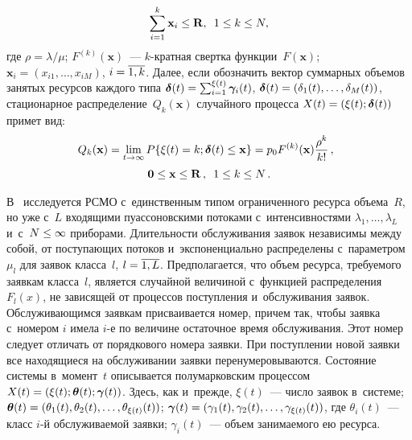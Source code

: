 \begin{multicols}{2}
\begin{align*}
\sum\limits_{i=1}^{k}\mathbf{x}_i\leq \mathbf{R}, \enskip 1\leq k \leq N,
\end{align*}
где $\rho=\lambda/\mu$; $F^{(k)}(\mathbf{x})$~--- $k$-крат\-ная свертка 
функции~$F(\mathbf{x})$; $\mathbf{x}_i=(x_{i1},\ldots,x_{iM})$, $i\hm=\overline{1,k}$.
Далее, если обозначить вектор суммарных объемов занятых ресурсов каждого типа 
$\boldsymbol{\delta}(t)\hm=\sum\nolimits_{i=1}^{\xi(t)}\boldsymbol{\gamma}_i(t)$, 
$\boldsymbol{\delta}(t)\hm=(\delta_1(t),\ldots,\delta_M(t))$, стационарное 
распределение~$Q_k(\mathbf{x})$ случайного процесса 
$X(t)\hm=(\xi(t);\boldsymbol{\delta}(t))$ примет вид:
\begin{multline*}
\label{eq:Q}
\hspace*{-6pt}Q_k(\mathbf{x})=\lim_{t\rightarrow \infty} P\{ \xi(t)=k; 
\boldsymbol{\delta}(t)\leq \mathbf{x}\}=p_0F^{(k)}(\mathbf{x}) 
\displaystyle\frac{\displaystyle \rho^{k}\mathstrut}{\displaystyle k!\mathstrut}\,,\\
\mathbf{0}\leq \mathbf{x} \leq \mathbf{R}\,,\enskip  1\leq k \leq N\,.
\end{multline*}

В~\cite{Naumov_6_2015} исследуется РСМО с~единственным типом ограниченного 
ресурса объема~$R$, но уже с~$L$ входящими пуассоновскими потоками 
с~интенсивностями $\lambda_1,\ldots,\lambda_L$ и~с~$N\hm\leq\infty$ приборами.\linebreak 
Длительности обслуживания заявок независимы между собой, от поступающих потоков и~экспоненциально распределены с~параметром~$\mu_l$ для заявок класса~$l$, 
$l\hm=\overline{1,L}$.
Предполагается, что объем %
ресурса, требуемого заявкам класса~$l$, является 
случайной величиной 
с~функцией распределения~$F_l(x)$, не зависящей от процессов поступления 
и~обслуживания заявок. Обслуживающимся заявкам присваивается номер, причем так, 
чтобы заявка с~номером $i$ имела $i$-е по величине остаточное время 
обслуживания. Этот номер следует отличать от порядкового номера заявки. При 
поступлении новой заявки все находящиеся на обслуживании заявки 
перенумеровываются.
Состояние системы в~момент~$t$ описывается полумарковским процессом 
$X(t)\hm=(\xi(t);\boldsymbol{\theta}(t);\boldsymbol{\gamma}(t))$. Здесь, как 
и~прежде, $\xi(t)$~--- число заявок в~сис\-те\-ме; 
$\boldsymbol{\theta}(t)\hm=(\theta_1(t),\theta_2(t),\ldots,\theta_{\xi(t)}(t))$; 
$\boldsymbol{\gamma}(t)\hm=(\gamma_1(t),\gamma_2(t),\ldots,\gamma_{\xi(t)}(t))$, где 
$\theta_i(t)$~--- класс $i$-й обслуживаемой заявки; $\gamma_i(t)$~--- объем 
занимаемого ею ресурса.


\end{multicols}
